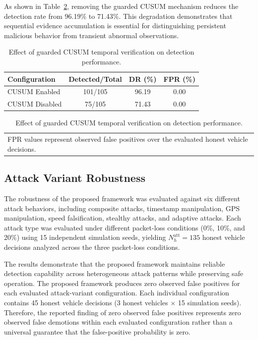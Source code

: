 \documentclass[journal]{IEEEtran}
\begin{document}
As shown in Table~\ref{tab:cusum_ablation}, removing the guarded CUSUM
mechanism reduces the detection rate from 96.19\% to 71.43\%. This degradation
demonstrates that sequential evidence accumulation is essential for
distinguishing persistent malicious behavior from transient abnormal
observations.

\begin{table}[!t]
\caption{Effect of guarded CUSUM temporal verification on detection
performance.}
\label{tab:cusum_ablation}
\centering
\footnotesize
\begin{tabular}{lccc}
\toprule
\textbf{Configuration} & \textbf{Detected/Total} & \textbf{DR (\%)} & \textbf{FPR (\%)} \\
\midrule
CUSUM Enabled  & 101/105 & 96.19 & 0.00 \\
CUSUM Disabled & 75/105  & 71.43 & 0.00 \\
\bottomrule
\end{tabular}
\par\smallskip
\begin{tabular}{@{}p{\columnwidth}@{}}
\footnotesize FPR values represent observed false positives over the evaluated honest vehicle decisions.
\end{tabular}
\end{table}

\subsection{Attack Variant Robustness}
\label{subsec:attack_results}

The robustness of the proposed framework was evaluated against six different
attack behaviors, including composite attacks, timestamp manipulation, GPS
manipulation, speed falsification, stealthy attacks, and adaptive attacks.
Each attack type was evaluated under different packet-loss conditions (0\%,
10\%, and 20\%) using 15 independent simulation seeds, yielding
$N_h^{\mathrm{att}}=135$ honest vehicle decisions analyzed across the three
packet-loss conditions.

The results demonstrate that the proposed framework maintains reliable
detection capability across heterogeneous attack patterns while preserving
safe operation. The proposed framework produces zero observed false positives
for each evaluated attack-variant configuration. Each individual
configuration contains 45 honest vehicle decisions (3 honest vehicles
$\times$ 15 simulation seeds). Therefore, the reported finding of zero observed
false positives represents zero observed false demotions within each evaluated
configuration rather than a universal guarantee that the false-positive
probability is zero.
\end{document}
